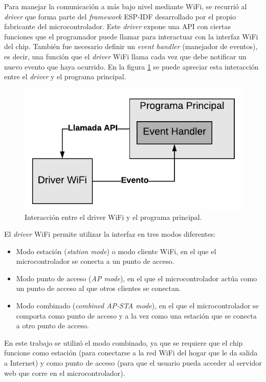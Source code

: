 Para manejar la comunicación a más bajo nivel mediante WiFi, se recurrió al \emph{driver} que forma parte del \emph{framework} ESP-IDF desarrollado por el propio fabricante del microcontrolador. Este \emph{driver} expone una API con ciertas funciones que el programador puede llamar para interactuar con la interfaz WiFi del chip. También fue necesario definir un \emph{event handler} (manejador de eventos), es decir, una función que el \emph{driver} WiFi llama cada vez que debe notificar un nuevo evento que haya ocurrido. En la figura \ref{fig:wifi_driver} se puede apreciar esta interacción entre el \emph{driver} y el programa principal.

\begin{figure}[h]
\centering
\includegraphics[scale=1.0]{./Figures/wifi_driver.pdf}
\caption{Interacción entre el driver WiFi y el programa principal.}
\label{fig:wifi_driver}
\end{figure}

El \emph{driver} WiFi permite utilizar la interfaz en tres modos diferentes:
\begin{itemize}
	\item Modo estación (\emph{station mode}) o modo cliente WiFi, en el que el microcontrolador se conecta a un punto de acceso.
	\item Modo punto de acceso (\emph{AP mode}), en el que el microcontrolador actúa como un punto de acceso al que otros clientes se conectan.
	\item Modo combinado (\emph{combined AP-STA mode}), en el que el microcontrolador se comporta como punto de acceso y a la vez como una estación que se conecta a otro punto de acceso.
\end{itemize}

En este trabajo se utilizó el modo combinado, ya que se requiere que el chip funcione como estación (para conectarse a la red WiFi del hogar que le da salida a Internet) y como punto de acceso (para que el usuario pueda acceder al servidor web que corre en el microcontrolador).

